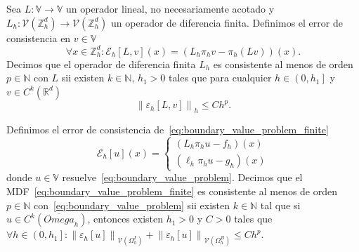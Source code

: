 \begin{definition}
    Sea
    \begin{math}
        L\colon\mathbb{V}\to\mathbb{V}
    \end{math}
    un operador lineal, no necesariamente acotado y
    \begin{math}
        L_{h}\colon
        \mathcal{V}\left(\mathbb{Z}^{d}_{h}\right)\to
        \mathcal{V}\left(\mathbb{Z}^{d}_{h}\right)
    \end{math}
    un operador de diferencia finita.
    Definimos el error de consistencia en $v\in\mathbb{V}$
    \begin{equation*}
        \forall x\in\mathbb{Z}^{d}_{h}:
        \mathcal{E}_{h}\left[L,v\right]\left(x\right)=
        \left(L_{h}\pi_{h}v-\pi_{h}\left(Lv\right)\right)
        \left(x\right).
    \end{equation*}
    Decimos que el operador de diferencia finita $L_{h}$ es
    consistente al menos de orden $p\in\mathbb{N}$ con $L$ sii
    existen $k\in\mathbb{N}$, $h_{1}>0$ tales que para cualquier
    \begin{math}
        h\in\left(0,h_{1}\right]
    \end{math}
    y
    \begin{math}
        v\in C^{k}\left(\mathbb{R}^{d}\right)
    \end{math}
    \begin{equation*}
        {\left\|\varepsilon_{h}\left[L,v\right]\right\|}_{h}\leq
        C h^{p}.
    \end{equation*}
\end{definition}

\begin{definition}[Consistencia]
    Definimos el error de consistencia
    de~\eqref{eq:boundary_value_problem_finite}
    \begin{equation*}
        \mathcal{E}_{h}
        \left[u\right]
        \left(x\right)=
        \begin{cases}
            \left(L_{h}\pi_{h}u-f_{h}\right)\left(x\right) \\
            \left(\ell_{h}\pi_{h}u-g_{h}\right)\left(x\right)
        \end{cases}
    \end{equation*}
    donde $u\in\mathbb{V}$
    resuelve~\eqref{eq:boundary_value_problem}.
    Decimos que el MDF~\eqref{eq:boundary_value_problem_finite} es
    consistente al menos de orden $p\in\mathbb{N}$
    con~\eqref{eq:boundary_value_problem} sii existen
    $k\in\mathbb{N}$ tal que si
    \begin{math}
        u\in C^{k}\left(\overline{Omega}_{h}\right)
    \end{math},
    entonces existen $h_{1}>0$ y $C>0$ tales que
    \begin{math}
        \forall h\in\left(0,h_{1}\right]:
        {
        \left\|\mathcal{\varepsilon}_{h}\left[u\right]\right\|
        }_{\mathcal{V}\left(\Omega^{I}_{h}\right)}+
        {
        \left\|\mathcal{\varepsilon}_{h}\left[u\right]\right\|
        }_{\mathcal{V}\left(\Omega^{B}_{h}\right)}\leq
        C h^{p}
    \end{math}.
\end{definition}

